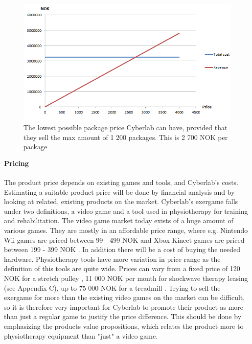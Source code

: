 \begin{figure}
\begin{center}
\includegraphics[scale=0.8]{revenuestreamprice}
\caption[Price example]{The lowest possible package price Cyberlab can have, provided that they sell the max amount of 1 200 packages. This is 2 700 NOK per package}
\label{fig:RevenueStreamPrice}
\end{center}
\end{figure}
\textbf{Pricing}\\ \\
The product price depends on existing games and tools, and Cyberlab's costs. Estimating a suitable product price will be done by financial analysis and by looking at related, existing products on the market. Cyberlab's exergame falls under two definitions, a video game and a tool used in physiotherapy for training and rehabilitation. The video game market today exists of a huge amount of various games. They are mostly in an affordable price range, where e.g. Nintendo Wii games are priced between 99 - 499 NOK \cite{elkjopwii} and Xbox Kinect games are priced between 199 - 399 NOK \cite{elkjopkinect}. In addition there will be a cost of buying the needed hardware. Physiotherapy tools have more variation in price range as the definition of this tools are quite wide. Prices can vary from a fixed price of 120 NOK for a stretch pulley \cite{stretchpulley}, 11 000 NOK per month for shockwave therapy leasing (see Appendix C), up to 75 000 NOK for a treadmill \cite{treadmill}. Trying to sell the exergame for more than the existing video games on the market can be difficult, so it is therefore very important for Cyberlab to promote their product as more than just a regular game to justify the price difference. This should be done by emphasizing the products value propositions, which relates the product more to physiotherapy equipment than "just" a video game. \\ \\
